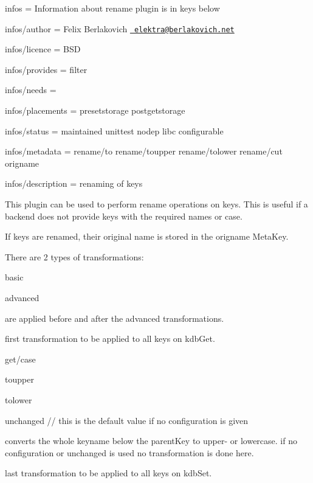 
\begin{DoxyItemize}
\item infos = Information about rename plugin is in keys below
\item infos/author = Felix Berlakovich \href{mailto:elektra@berlakovich.net}{\texttt{ elektra@berlakovich.\+net}}
\item infos/licence = B\+SD
\item infos/provides = filter
\item infos/needs =
\item infos/placements = presetstorage postgetstorage
\item infos/status = maintained unittest nodep libc configurable
\item infos/metadata = rename/to rename/toupper rename/tolower rename/cut origname
\item infos/description = renaming of keys
\end{DoxyItemize}

This plugin can be used to perform rename operations on keys. This is useful if a backend does not provide keys with the required names or case.

If keys are renamed, their original name is stored in the {\ttfamily origname} Meta\+Key.

There are 2 types of transformations\+:


\begin{DoxyItemize}
\item basic
\item advanced
\end{DoxyItemize}

are applied before and after the advanced transformations.

first transformation to be applied to all keys on kdb\+Get.

{\ttfamily get/case}


\begin{DoxyItemize}
\item toupper
\item tolower
\item unchanged // this is the default value if no configuration is given
\end{DoxyItemize}

converts the whole keyname below the parent\+Key to upper-\/ or lowercase. if no configuration or {\ttfamily unchanged} is used no transformation is done here.

last transformation to be applied to all keys on kdb\+Set.

